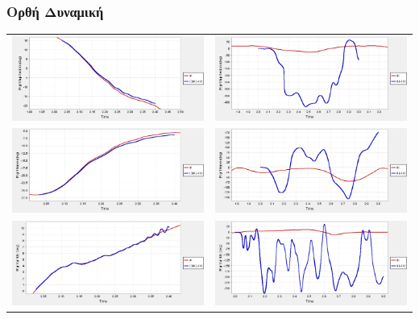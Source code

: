 \documentclass[8pt,sans,mathserif]{beamer}%
\begin{document}
\begin{frame}
\frametitle{Ορθή Δυναμική}
    \begin{tabular}{cc}
        \includegraphics[width=.48\textwidth, keepaspectratio]{fig/hip-ik-cmc.png} & \includegraphics[width=.48\textwidth, keepaspectratio]{fig/hip-ik-id.png}\\[3pt]
        \includegraphics[width=.48\textwidth, keepaspectratio]{fig/knee-ik-cmc.png} & \includegraphics[width=.48\textwidth, keepaspectratio]{fig/knee-ik-id.png}\\[3pt]
        \includegraphics[width=.48\textwidth, keepaspectratio]{fig/ankle-ik-cmc.png} & \includegraphics[width=.48\textwidth, keepaspectratio]{fig/ankle-ik-id.png}
    \end{tabular}
\end{frame}
\end{document}
